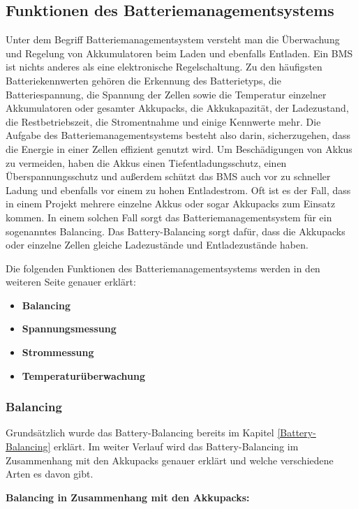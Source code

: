 \subsection{Funktionen des Batteriemanagementsystems}

Unter dem Begriff Batteriemanagementsystem versteht man die Überwachung und Regelung von Akkumulatoren beim Laden und ebenfalls Entladen. Ein BMS ist nichts anderes als eine elektronische Regelschaltung. Zu den häufigsten Batteriekennwerten gehören die Erkennung des Batterietyps, die Batteriespannung, die Spannung der Zellen sowie die Temperatur einzelner Akkumulatoren oder gesamter Akkupacks, die Akkukapazität, der Ladezustand, die Restbetriebszeit, die Stromentnahme und einige Kennwerte mehr. Die Aufgabe des Batteriemanagementsystems besteht also darin, sicherzugehen, dass die Energie in einer Zellen effizient genutzt wird. Um Beschädigungen von Akkus zu vermeiden, haben die Akkus einen Tiefentladungsschutz, einen Überspannungsschutz und außerdem schützt das BMS auch vor zu schneller Ladung und ebenfalls vor einem zu hohen Entladestrom. Oft ist es der Fall, dass in einem Projekt mehrere einzelne Akkus oder sogar Akkupacks zum Einsatz kommen. In einem solchen Fall sorgt das Batteriemanagementsystem für ein sogenanntes Balancing. Das Battery-Balancing sorgt dafür, dass die Akkupacks oder einzelne Zellen gleiche Ladezustände und Entladezustände haben. 

Die folgenden Funktionen des Batteriemanagementsystems werden in den weiteren Seite genauer erklärt:

\begin{itemize}
	\item \textbf{Balancing}
	\item \textbf{Spannungsmessung}
	\item \textbf{Strommessung}
	\item \textbf{Temperaturüberwachung}
\end{itemize}


\newpage

\subsubsection{Balancing}

Grundsätzlich wurde das Battery-Balancing bereits im Kapitel \ref{Battery-Balancing} erklärt. Im weiter Verlauf wird das Battery-Balancing im Zusammenhang mit den Akkupacks genauer erklärt und welche verschiedene Arten es davon gibt.


\textbf{Balancing in Zusammenhang mit den Akkupacks:}

